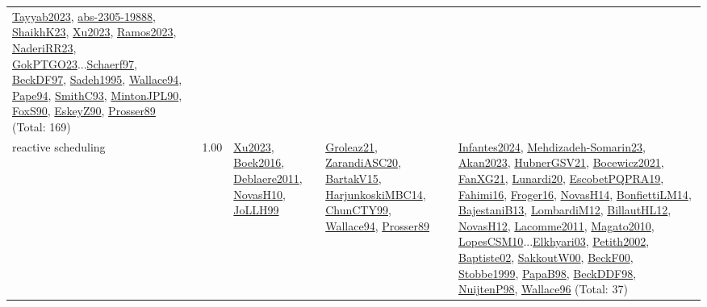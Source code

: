 {\begin{longtable}{p{3cm}r>{\raggedright\arraybackslash}p{6cm}>{\raggedright\arraybackslash}p{6cm}>{\raggedright\arraybackslash}p{8cm}}
\hyperref[detail:Tayyab2023]{Tayyab2023}, \hyperref[detail:abs-2305-19888]{abs-2305-19888}, \hyperref[detail:ShaikhK23]{ShaikhK23}, \hyperref[detail:Xu2023]{Xu2023}, \hyperref[detail:Ramos2023]{Ramos2023}, \hyperref[detail:NaderiRR23]{NaderiRR23}, \hyperref[detail:GokPTGO23]{GokPTGO23}...\hyperref[detail:Schaerf97]{Schaerf97}, \hyperref[detail:BeckDF97]{BeckDF97}, \hyperref[detail:Sadeh1995]{Sadeh1995}, \hyperref[detail:Wallace94]{Wallace94}, \hyperref[detail:Pape94]{Pape94}, \hyperref[detail:SmithC93]{SmithC93}, \hyperref[detail:MintonJPL90]{MintonJPL90}, \hyperref[detail:FoxS90]{FoxS90}, \hyperref[detail:EskeyZ90]{EskeyZ90}, \hyperref[detail:Prosser89]{Prosser89} (Total: 169)\\
\index{reactive scheduling}\index{Concepts!reactive scheduling}reactive scheduling &  1.00 & \hyperref[detail:Xu2023]{Xu2023}, \hyperref[detail:Boek2016]{Boek2016}, \hyperref[detail:Deblaere2011]{Deblaere2011}, \hyperref[detail:NovasH10]{NovasH10}, \hyperref[detail:JoLLH99]{JoLLH99} & \hyperref[detail:Groleaz21]{Groleaz21}, \hyperref[detail:ZarandiASC20]{ZarandiASC20}, \hyperref[detail:BartakV15]{BartakV15}, \hyperref[detail:HarjunkoskiMBC14]{HarjunkoskiMBC14}, \hyperref[detail:ChunCTY99]{ChunCTY99}, \hyperref[detail:Wallace94]{Wallace94}, \hyperref[detail:Prosser89]{Prosser89} & \hyperref[detail:Infantes2024]{Infantes2024}, \hyperref[detail:Mehdizadeh-Somarin23]{Mehdizadeh-Somarin23}, \hyperref[detail:Akan2023]{Akan2023}, \hyperref[detail:HubnerGSV21]{HubnerGSV21}, \hyperref[detail:Bocewicz2021]{Bocewicz2021}, \hyperref[detail:FanXG21]{FanXG21}, \hyperref[detail:Lunardi20]{Lunardi20}, \hyperref[detail:EscobetPQPRA19]{EscobetPQPRA19}, \hyperref[detail:Fahimi16]{Fahimi16}, \hyperref[detail:Froger16]{Froger16}, \hyperref[detail:NovasH14]{NovasH14}, \hyperref[detail:BonfiettiLM14]{BonfiettiLM14}, \hyperref[detail:BajestaniB13]{BajestaniB13}, \hyperref[detail:LombardiM12]{LombardiM12}, \hyperref[detail:BillautHL12]{BillautHL12}, \hyperref[detail:NovasH12]{NovasH12}, \hyperref[detail:Lacomme2011]{Lacomme2011}, \hyperref[detail:Magato2010]{Magato2010}, \hyperref[detail:LopesCSM10]{LopesCSM10}...\hyperref[detail:Elkhyari03]{Elkhyari03}, \hyperref[detail:Petith2002]{Petith2002}, \hyperref[detail:Baptiste02]{Baptiste02}, \hyperref[detail:SakkoutW00]{SakkoutW00}, \hyperref[detail:BeckF00]{BeckF00}, \hyperref[detail:Stobbe1999]{Stobbe1999}, \hyperref[detail:PapaB98]{PapaB98}, \hyperref[detail:BeckDDF98]{BeckDDF98}, \hyperref[detail:NuijtenP98]{NuijtenP98}, \hyperref[detail:Wallace96]{Wallace96} (Total: 37)\\

\end{longtable}}
